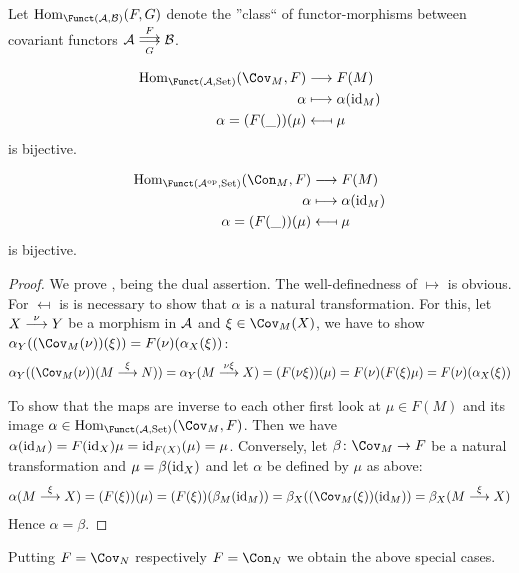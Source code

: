 \documentclass[a4paper,parskip=half,numbers=enddot, DIV=12]{scrreprt}
\begin{document}
	\begin{lem}
        Let $\Hom_{\Funct(\Aa,\Bb)}(F,G)$ denote the ''class`` of functor-morphisms between covariant functors $\Aa\doublemorphism[F][G] \Bb$.
        \begin{alphanumerate}
          \item 
            \begin{align*}
                \Hom_{\Funct(\Aa,\cat{Set})}(\Cov_M, F) &\longto F(M)\\
                \alpha &\longmapsto \alpha(\id_M)\\
                \alpha = (F(\_))(\mu) &\longmapsfrom \mu
            \end{align*}
            is bijective.
          \item 
            \begin{align*}
                \Hom_{\Funct(\Aa^\op,\cat{Set})}(\Con_M, F) &\longto F(M)\\
                \alpha &\longmapsto \alpha(\id_M)\\
                \alpha = (F(\_))(\mu) &\longmapsfrom \mu
            \end{align*}
            is bijective.
        \end{alphanumerate}
	\end{lem}
	\begin{proof}
        We prove ,  being the dual assertion. The well-definedness of $\mapsto$ is obvious. For $\mapsfrom$ is is necessary to show that $\alpha$ is a natural transformation. For this, let $X\morphism[\nu] Y$ be a morphism in $\mathcal{A}$ and $\xi\in\Cov_M(X)$, we have to show $\alpha_Y((\Cov_M(\nu))(\xi)) = F(\nu)(\alpha_X(\xi))$:
        \begin{align*}
            \alpha_Y((\Cov_M(\nu))(M\morphism[\xi] N)) = \alpha_Y(M\morphism[\nu \xi] X) = (F(\nu\xi))(\mu) = F(\nu)(F(\xi)\mu) = F(\nu)(\alpha_X(\xi))
        \end{align*}
        
        To show that the maps are inverse to each other first look at $\mu\in F(M)$ and its image $\alpha\in\Hom_{\Funct(\Aa,\cat{Set})}(\Cov_M, F)$. Then we have $\alpha(\operatorname{id}_M) = F(\operatorname{id}_X)\mu = \operatorname{id}_{F(X)}(\mu)=\mu$. Conversely, let $\beta\colon \Cov_M\morphism F$ be a natural transformation and $\mu = \beta(\operatorname{id}_X)$ and let $\alpha$ be defined by $\mu$ as above:
        \begin{align*}
            \alpha(M\morphism[\xi] X) = (F(\xi))(\mu) = (F(\xi))(\beta_M(\id_M)) = \beta_X((\Cov_M(\xi))(\id_M)) = \beta_X(M\morphism[\xi]X)
        \end{align*}
        Hence $\alpha = \beta$.
	\end{proof}
	Putting $F= \Cov_N$ respectively $F=\Con_N$ we obtain the above special cases.
\printbibliography
\end{document}
